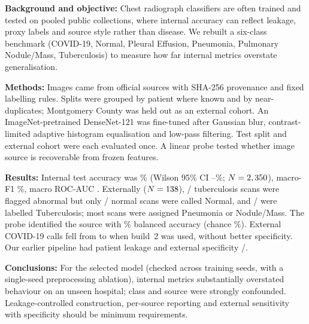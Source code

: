 \noindent\textbf{Background and objective:} Chest radiograph classifiers are often trained and tested on pooled public collections, where internal accuracy can reflect leakage, proxy labels and source style rather than disease. We rebuilt a six-class benchmark (COVID-19, Normal, Pleural Effusion, Pneumonia, Pulmonary Nodule/Mass, Tuberculosis) to measure how far internal metrics overstate generalisation.

\noindent\textbf{Methods:} Images came from official sources with SHA-256 provenance and fixed labelling rules. Splits were grouped by patient where known and by near-duplicates; Montgomery County was held out as an external cohort. An ImageNet-pretrained DenseNet-121 was fine-tuned after Gaussian blur, contrast-limited adaptive histogram equalisation and low-pass filtering. Test split and external cohort were each evaluated once. A linear probe tested whether image source is recoverable from frozen features.

\noindent\textbf{Results:} Internal test accuracy was \RTestAcc\% (Wilson 95\% CI \RTestAccLo--\RTestAccHi\%; $N=2,350$), macro-F1 \RTestMacroFOne\%, macro ROC-AUC \RTestMacroAUC. Externally ($N=138$), \RExtSensK/\RExtSensN{} tuberculosis scans were flagged abnormal but only \RExtSpecK/\RExtSpecN{} normal scans were called Normal, and \RExtTBK/\RExtTBN{} were labelled Tuberculosis; most scans were assigned Pneumonia or Nodule/Mass. The probe identified the source with \RProbeImgBalAcc\% balanced accuracy (chance \RProbeImgChance\%). External COVID-19 calls fell from \RRunOneExtCovidCalls{} to \RExtCovidCalls{} when build~2 was used, without better specificity. Our earlier pipeline had patient leakage and external specificity \RVFiveExtSpecK/\RVFiveExtSpecN.

\noindent\textbf{Conclusions:} For the selected model (checked across \RMSNRuns{} training seeds, with a single-seed preprocessing ablation), internal metrics substantially overstated behaviour on an unseen hospital; class and source were strongly confounded. Leakage-controlled construction, per-source reporting and external sensitivity with specificity should be minimum requirements.
